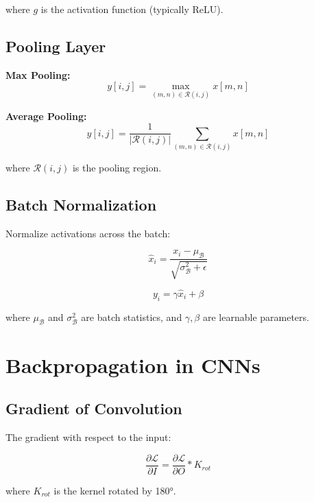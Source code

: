 \documentclass[12pt,a4paper]{article}
\begin{document}
where $g$ is the activation function (typically ReLU).

\subsection{Pooling Layer}

\textbf{Max Pooling:}
\begin{equation}
y[i, j] = \max_{(m,n) \in \mathcal{R}(i,j)} x[m, n]
\end{equation}

\textbf{Average Pooling:}
\begin{equation}
y[i, j] = \frac{1}{|\mathcal{R}(i,j)|} \sum_{(m,n) \in \mathcal{R}(i,j)} x[m, n]
\end{equation}

where $\mathcal{R}(i,j)$ is the pooling region.

\subsection{Batch Normalization}

Normalize activations across the batch:

\begin{equation}
\hat{x}_i = \frac{x_i - \mu_\mathcal{B}}{\sqrt{\sigma_\mathcal{B}^2 + \epsilon}}
\end{equation}

\begin{equation}
y_i = \gamma \hat{x}_i + \beta
\end{equation}

where $\mu_\mathcal{B}$ and $\sigma_\mathcal{B}^2$ are batch statistics, and $\gamma, \beta$ are learnable parameters.

\section{Backpropagation in CNNs}

\subsection{Gradient of Convolution}

The gradient with respect to the input:

\begin{equation}
\frac{\partial \mathcal{L}}{\partial I} = \frac{\partial \mathcal{L}}{\partial O} * K_{rot}
\end{equation}

where $K_{rot}$ is the kernel rotated by 180°.
\end{document}
